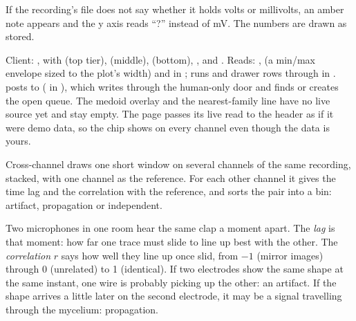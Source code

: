 \begin{watchout}
If the recording's file does not say whether it holds volts or millivolts, an amber note
appears and the y axis reads ``?'' instead of mV. The numbers are drawn as stored.
\end{watchout}

\begin{underthehood}[Signal]
Client: , with  (top tier),
 (middle),  (bottom), ,
 and . Reads: ,  (a min/max envelope sized to the plot's width) and
 in ; runs and drawer rows through 
in .  posts to
 ( in
), which writes through the human-only door
 and finds or creates the open  queue. The medoid
overlay and the nearest-family line have no live source yet and stay empty. The page passes
its live read to the header as if it were demo data, so the  chip shows on
every channel even though the data is yours.
\end{underthehood}

Cross-channel draws one short window on several channels of the same recording, stacked, with
one channel as the reference. For each other channel it gives the time lag and the
correlation with the reference, and sorts the pair into a bin: artifact, propagation or
independent.

\begin{plainterms}
Two microphones in one room hear the same clap a moment apart. The \emph{lag} is that moment:
how far one trace must slide to line up best with the other. The \emph{correlation} $r$ says
how well they line up once slid, from $-1$ (mirror images) through 0 (unrelated) to 1
(identical). If two electrodes show the same shape at the same instant, one wire is probably
picking up the other: an artifact. If the shape arrives a little later on the second
electrode, it may be a signal travelling through the mycelium: propagation.
\end{plainterms}

